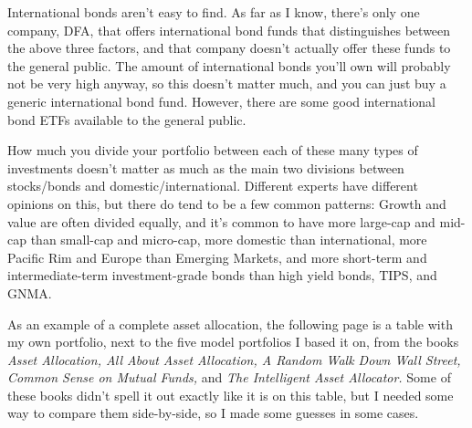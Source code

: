 International bonds aren't easy to find. As far as I know, there's only one company, DFA, that offers international bond funds that distinguishes between the above three factors, and that company doesn't actually offer these funds to the general public. The amount of international bonds you'll own will probably not be very high anyway, so this doesn't matter much, and you can just buy a generic international bond fund. However, there are some good international bond ETFs available to the general public.

How much you divide your portfolio between each of these many types of investments doesn't matter as much as the main two divisions between stocks/bonds and domestic/international. Different experts have different opinions on this, but there do tend to be a few common patterns: Growth and value are often divided equally, and it's common to have more large-cap and mid-cap than small-cap and micro-cap, more domestic than international, more Pacific Rim and Europe than Emerging Markets, and more short-term and intermediate-term investment-grade bonds than high yield bonds, TIPS, and GNMA.

As an example of a complete asset allocation, the following page is a table with my own portfolio, next to the five model portfolios I based it on, from the books \emph{Asset Allocation, All About Asset Allocation, A Random Walk Down Wall Street, Common Sense on Mutual Funds,} and \emph{The Intelligent Asset Allocator.} Some of these books didn't spell it out exactly like it is on this table, but I needed some way to compare them side-by-side, so I made some guesses in some cases.


